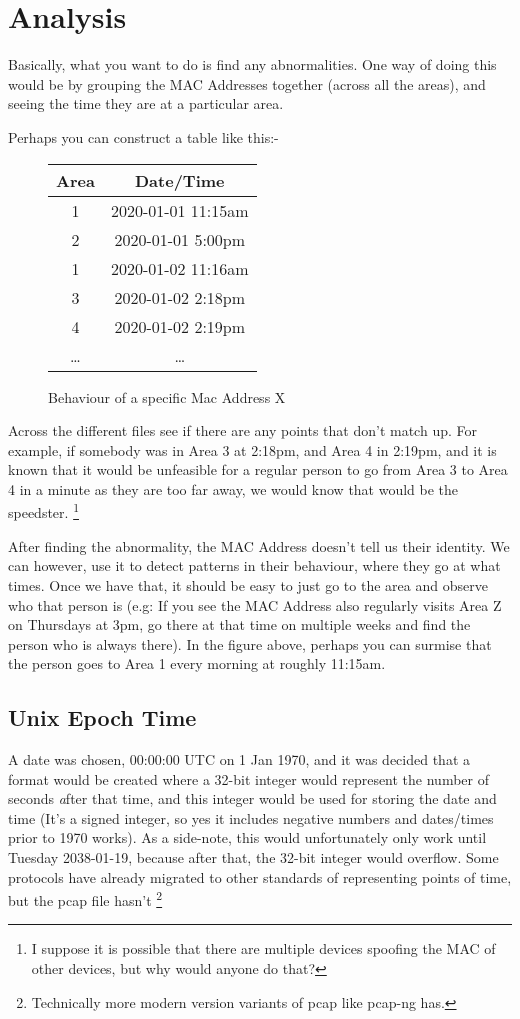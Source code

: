 \documentclass[a4paper,10pt, twocolumn]{article}
\begin{document}
\section{Analysis}
Basically, what you want to do is find any abnormalities.
One way of doing this would be by grouping the MAC Addresses together
(across all the areas),
and seeing the time they are at a particular area. \cite{Unix_time}

Perhaps you can construct a table like this:-
\begin{figure}[htbp]
    \centering
    \begin{tabular} {| c | c |}
    \hline
    Area & Date/Time \\
    \hline
    1 & 2020-01-01 11:15am\\
    \hline
    2 & 2020-01-01 5:00pm\\
    \hline
    1 & 2020-01-02 11:16am \\
    \hline
    3 & 2020-01-02 2:18pm \\
    \hline
    4 & 2020-01-02 2:19pm \\
    \hline
    \ldots & \ldots \\
    \hline
    \end{tabular}
    \caption{Behaviour of a specific Mac Address X}
\end{figure}

Across the different files see if there are any points that 
don't match up. For example, if somebody was in Area 3 at 2:18pm,
and Area 4 in 2:19pm, and it is known that it would be unfeasible
for a regular person to go from Area 3 to Area 4 in a minute as
they are too far away, we would know that would be the speedster.
\footnote{I suppose it is possible that there are multiple devices
spoofing the MAC of other devices, but why would anyone do that?}

After finding the abnormality, the MAC Address doesn't tell us their
identity. We can however, use it to detect patterns in their behaviour,
where they go at what times. Once we have that, it should be easy
to just go to the area and observe who that person is (e.g: 
If you see the MAC Address also regularly visits Area Z on
Thursdays at 3pm, go there at that time on multiple weeks
and find the person who is always there).
In the figure above, perhaps you can surmise that the person
goes to Area 1 every morning at roughly 11:15am.


\subsection{Unix Epoch Time}
A date was chosen, 00:00:00 UTC on 1 Jan 1970, and it was decided
that a format would be created where a 32-bit integer would represent
the number of seconds {\emph after} that time, and this integer
would be used for storing the date and time (It's a signed integer,
so yes it includes negative numbers and dates/times prior to 1970
works). As a side-note, this would unfortunately only work until 
Tuesday 2038-01-19, because after that, the 32-bit integer would
overflow. Some protocols have already migrated to other standards
of representing points of time, but the pcap file hasn't \footnote{
Technically more modern version variants of pcap like pcap-ng has.}
\end{document}
